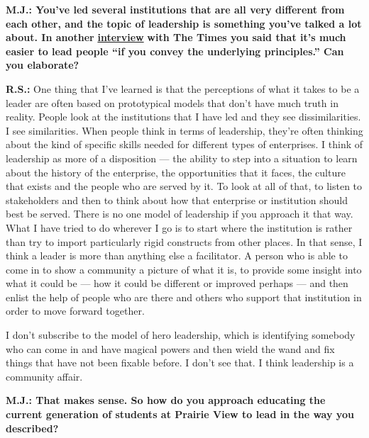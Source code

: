 \textbf{M.J.: You've led several institutions that are all very
different from each other, and the topic of leadership is something
you've talked a lot about. In another}
\href{http://www.nytimes3xbfgragh.onion/2011/12/04/business/ruth-simmons-of-brown-university-on-amiable-leadership.html}{\textbf{interview}}
\textbf{with The Times you said that it's much easier to lead people
``if you convey the underlying principles.'' Can you elaborate?}

\textbf{R.S.:} One thing that I've learned is that the perceptions of
what it takes to be a leader are often based on prototypical models that
don't have much truth in reality. People look at the institutions that I
have led and they see dissimilarities. I see similarities. When people
think in terms of leadership, they're often thinking about the kind of
specific skills needed for different types of enterprises. I think of
leadership as more of a disposition --- the ability to step into a
situation to learn about the history of the enterprise, the
opportunities that it faces, the culture that exists and the people who
are served by it. To look at all of that, to listen to stakeholders and
then to think about how that enterprise or institution should best be
served. There is no one model of leadership if you approach it that way.
What I have tried to do wherever I go is to start where the institution
is rather than try to import particularly rigid constructs from other
places. In that sense, I think a leader is more than anything else a
facilitator. A person who is able to come in to show a community a
picture of what it is, to provide some insight into what it could be ---
how it could be different or improved perhaps --- and then enlist the
help of people who are there and others who support that institution in
order to move forward together.

I don't subscribe to the model of hero leadership, which is identifying
somebody who can come in and have magical powers and then wield the wand
and fix things that have not been fixable before. I don't see that. I
think leadership is a community affair.

\textbf{M.J.: That makes sense. So how do you approach educating the
current generation of students at Prairie View to lead in the way you
described?}

